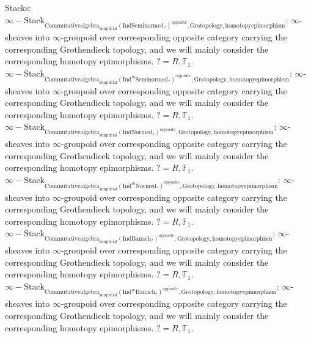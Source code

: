 \documentclass[11pt]{book}
\theoremstyle{definition}
\numberwithin{equation}{section}
\begin{document}
 
\noindent Stacks:\\
 
 \noindent $\infty-\mathrm{Stack}_{\mathrm{Commutativealgebra}_{\mathrm{simplicial}}(\mathrm{Ind}\mathrm{Seminormed}_?)^\mathrm{opposite},\mathrm{Grotopology,homotopyepimorphism}}$: $\infty$-sheaves into $\infty$-groupoid over corresponding opposite category carrying the corresponding Grothendieck topology, and we will mainly consider the corresponding homotopy epimorphisms. $?=R,\mathbb{F}_1$.\\
\noindent $\infty-\mathrm{Stack}_{\mathrm{Commutativealgebra}_{\mathrm{simplicial}}(\mathrm{Ind}^m\mathrm{Seminormed}_?)^\mathrm{opposite},\mathrm{Grotopology,homotopyepimorphism}}$: $\infty$-sheaves into $\infty$-groupoid over corresponding opposite category carrying the corresponding Grothendieck topology, and we will mainly consider the corresponding homotopy epimorphisms. $?=R,\mathbb{F}_1$.\\
\noindent $\infty-\mathrm{Stack}_{\mathrm{Commutativealgebra}_{\mathrm{simplicial}}(\mathrm{Ind}\mathrm{Normed}_?)^\mathrm{opposite},\mathrm{Grotopology,homotopyepimorphism}}$: $\infty$-sheaves into $\infty$-groupoid over corresponding opposite category carrying the corresponding Grothendieck topology, and we will mainly consider the corresponding homotopy epimorphisms. $?=R,\mathbb{F}_1$.\\
\noindent $\infty-\mathrm{Stack}_{\mathrm{Commutativealgebra}_{\mathrm{simplicial}}(\mathrm{Ind}^m\mathrm{Normed}_?)^\mathrm{opposite},\mathrm{Grotopology,homotopyepimorphism}}$: $\infty$-sheaves into $\infty$-groupoid over corresponding opposite category carrying the corresponding Grothendieck topology, and we will mainly consider the corresponding homotopy epimorphisms. $?=R,\mathbb{F}_1$.\\
\noindent $\infty-\mathrm{Stack}_{\mathrm{Commutativealgebra}_{\mathrm{simplicial}}(\mathrm{Ind}\mathrm{Banach}_?)^\mathrm{opposite},\mathrm{Grotopology,homotopyepimorphism}}$: $\infty$-sheaves into $\infty$-groupoid over corresponding opposite category carrying the corresponding Grothendieck topology, and we will mainly consider the corresponding homotopy epimorphisms. $?=R,\mathbb{F}_1$.\\
\noindent $\infty-\mathrm{Stack}_{\mathrm{Commutativealgebra}_{\mathrm{simplicial}}(\mathrm{Ind}^m\mathrm{Banach}_?)^\mathrm{opposite},\mathrm{Grotopology,homotopyepimorphism}}$: $\infty$-sheaves into $\infty$-groupoid over corresponding opposite category carrying the corresponding Grothendieck topology, and we will mainly consider the corresponding homotopy epimorphisms. $?=R,\mathbb{F}_1$.\\
 
\end{document}
